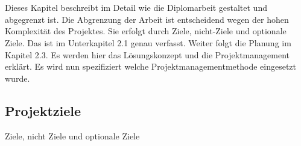 \chapter{\docname}
\label{\docname}
Dieses Kapitel beschreibt im Detail wie die Diplomarbeit gestaltet und abgegrenzt ist. Die Abgrenzung der Arbeit ist entscheidend wegen der hohen Komplexität des Projektes. Sie erfolgt durch Ziele, nicht-Ziele und optionale Ziele. Das ist im Unterkapitel 2.1 genau verfasst. 
Weiter folgt die Planung im Kapitel 2.3. Es werden hier das Lösungskonzept und die Projektmanagement erklärt. Es wird nun spezifiziert welche Projektmanagementmethode eingesetzt wurde.
\section{Projektziele}
Ziele, nicht Ziele und optionale Ziele
